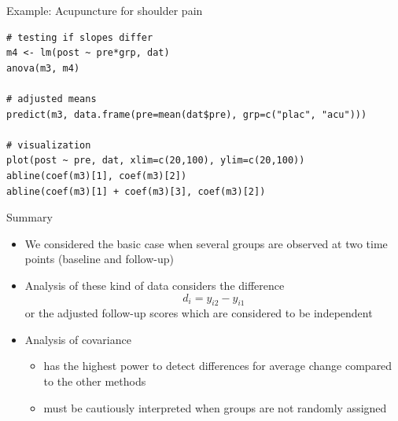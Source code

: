 \documentclass[aspectratio=169]{beamer}
\begin{document}
\begin{frame}[fragile]{Example: Acupuncture for shoulder pain}
\begin{lstlisting}
# testing if slopes differ
m4 <- lm(post ~ pre*grp, dat)
anova(m3, m4)

# adjusted means
predict(m3, data.frame(pre=mean(dat$pre), grp=c("plac", "acu")))

# visualization
plot(post ~ pre, dat, xlim=c(20,100), ylim=c(20,100))
abline(coef(m3)[1], coef(m3)[2])
abline(coef(m3)[1] + coef(m3)[3], coef(m3)[2])
\end{lstlisting}
\end{frame}



\begin{frame}{Summary}
\begin{itemize}
  \item We considered the basic case when several groups are observed at
    two time points (baseline and follow-up)
  \item Analysis of these kind of data considers the difference
    \[
        d_i = y_{i2} - y_{i1}
    \]
    or the adjusted follow-up scores which are considered to be independent
  \item Analysis of covariance
  \begin{itemize}
    \item has the highest power to detect differences for average change
      compared to the other methods
    \item must be cautiously interpreted when groups are not randomly
      assigned
  \end{itemize}
\end{itemize}
\end{frame}
\end{document}
